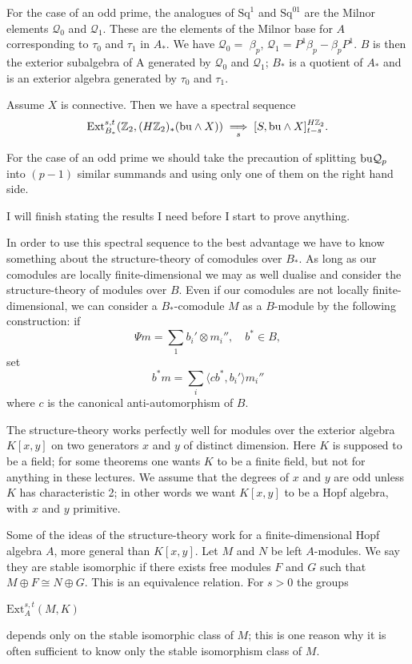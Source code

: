 \documentclass[../main]{subfiles}
\begin{document}
For the case of an odd prime, the analogues of $\mathrm{Sq}^{1}$ and $\mathrm{Sq}^{01}$ are the Milnor elements $\mathcal{Q}_{0}$ and $\mathcal{Q}_{1}$. These are the elements of the Milnor base for $A$ corresponding to $\tau_{0}$ and $\tau_{1}$ in $A_{\ast}$. We have $\mathcal{Q}_{0}=$ $\beta_{p}$, $\mathcal{Q}_{1}=P^{1}\beta_{p}-\beta_{p}P^{1}$. $B$ is then the exterior subalgebra of A generated by $\mathcal{Q}_{0}$ and $\mathcal{Q}_{1}$; $B_{\ast}$ is a quotient of $A_{\ast}$ and is an exterior algebra generated by $\tau_{0}$ and $\tau_{1}$.

\qquad \begin{proposition} \label{prop:p3ch16.1} Assume $X$ is connective. Then we have a spectral sequence
\begin{equation*}
    \mathrm{Ext}_{B_\ast}^{s, t} (\mathbb{Z}_2, (H\mathbb{Z}_2)_{\ast}(\mathrm{bu} \wedge X)) \underset{s}{\implies} [S, \mathrm{bu} \wedge X ]_{t-s}^{H\mathbb{Z}_2}.
\end{equation*}
\end{proposition}
    For the case of an odd prime we should take the precaution of splitting $\mathrm{bu}\mathcal{Q}_{p}$ into $(p-1)$ similar summands and using only one of them on the right hand side.
    
    I will finish stating the results I need before I start to prove anything. 
    
    In order to use this spectral sequence to the best advantage we have to know something about the structure-theory of comodules over $B_{\ast}$. As long as our comodules are locally finite-dimensional we may as well dualise and consider the structure-theory of modules over $B$. Even if our comodules are not locally finite-dimensional, we can consider a $B_{\ast}$-comodule $M$ as a $B$-module by the following construction: if \[
        \Psi m= \sum_{1} b_{i}' \otimes m_{i}'', \quad b^{\ast} \in B, 
    \]
    set
    \[
        b^{\ast}m=\sum_{i} \langle cb^{\ast}, b_{i}'\rangle m_{i}''
    \]
    where $c$ is the canonical anti-automorphism of $B$.
    
    The structure-theory works perfectly well for modules over the exterior algebra $K[x, y]$ on two generators $x$ and $y$ of distinct dimension. Here $K$ is supposed to be a field; for some theorems one wants $K$ to be a finite field, but not for anything in these lectures. We assume that the degrees of $x$ and $y$ are odd unless $K$ has characteristic 2; in other words we want $K[x, y]$ to be a Hopf algebra, with $x$ and $y$ primitive.
    
    Some of the ideas of the structure-theory work for a finite-dimensional Hopf algebra $A$, more general than $K[x, y]$. Let $M$ and $N$ be left $A$-modules. We say they are stable isomorphic if there exists free modules $F$ and $G$ such that $M\oplus F \cong N \oplus G$. This is an equivalence relation. For $s>0$ the groups \begin{center}
         $\mathrm{Ext}_{A}^{s, t} (M, K)$
    \end{center}
    depends only on the stable isomorphic class of $M$; this is one reason why it is often sufficient to know only the stable isomorphism class of $M$. 
    
\end{document}
